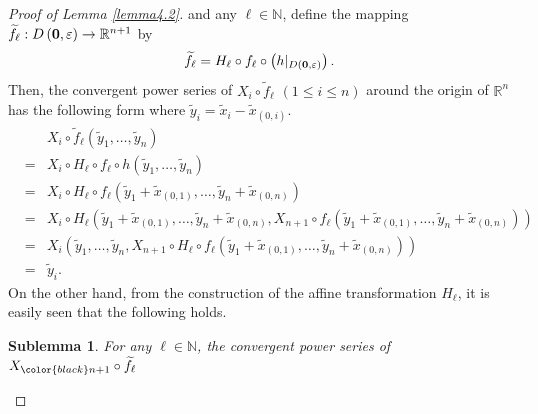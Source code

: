 \documentclass{amsart}
\newtheorem{sublemma}{Sublemma}[section]
\theoremstyle{definition}
\theoremstyle{definition}
\theoremstyle{definition}
\newcommand{\ch}[1]{{\color{black} #1}}
\begin{document}
{{\begin{proof}[Proof of Lemma \ref{lemma4.2}]
{and any $\ell\in \mathbb{N}$, 
define the mapping 
$
\widetilde{f}_\ell: D\left({\bf 0}, \varepsilon\right)\to \mathbb{R}^{n+1} 
$
by 
\[
\widetilde{f}_{\ell}=H_\ell\circ f_{\ell}\circ 
\left(h|_{D\left({\bf 0}, \varepsilon\right)}\right). 
\]     
Then, the convergent power series of 
$X_i\circ \widetilde{f}_{\ell}$ $(1\le i\le n)$ around the origin of 
$\mathbb{R}^n$ has the following form where 
$\widetilde{y}_i=\widetilde{x}_i-\widetilde{x}_{(0,i)}$.   
\begin{eqnarray*}
{ } & { } &  X_i\circ \widetilde{f}_\ell
\left(\widetilde{y}_1, \ldots, \widetilde{y}_n\right)  \\
{ } & = & 
X_i\circ H_\ell\circ f_\ell\circ h\left(\widetilde{y}_1, \ldots, \widetilde{y}_n\right) 
\\ 
{ } & = &  
X_i\circ H_\ell\circ f_\ell 
\left(\widetilde{y}_1+\widetilde{x}_{(0,1)}, \ldots, 
\widetilde{y}_n+\widetilde{x}_{(0,n)}
\right) \\ 
{ } & = & 
X_i\circ H_\ell %
\left(\widetilde{y}_1+\widetilde{x}_{(0,1)}, \ldots, 
\widetilde{y}_n+\widetilde{x}_{(0,n)}, 
X_{n+1}\circ f_\ell 
\left(\widetilde{y}_1+\widetilde{x}_{(0,1)}, \ldots, 
\widetilde{y}_n+\widetilde{x}_{(0,n)}
\right) 
\right) \\ 
{ } & = & 
X_i\left(\widetilde{y}_1, \ldots, \widetilde{y}_n , 
X_{n+1}\circ H_\ell \circ f_\ell 
\left(\widetilde{y}_1+\widetilde{x}_{(0,1)}, \ldots, 
\widetilde{y}_n+\widetilde{x}_{(0,n)} 
\right) 
\right) \\ 
{ } & = &  \widetilde{y}_i.   
\end{eqnarray*}
On the other hand, from the construction of the affine transformation 
$H_\ell$, it is easily seen that the following holds.
\begin{sublemma}\label{sublemma_powerseries}
For any $\ell\in \mathbb{N}$, 
the convergent power series of $X_{\ch{n+1}}\circ \widetilde{f}_\ell$

\end{sublemma}}
\end{proof}}}
\end{document}
